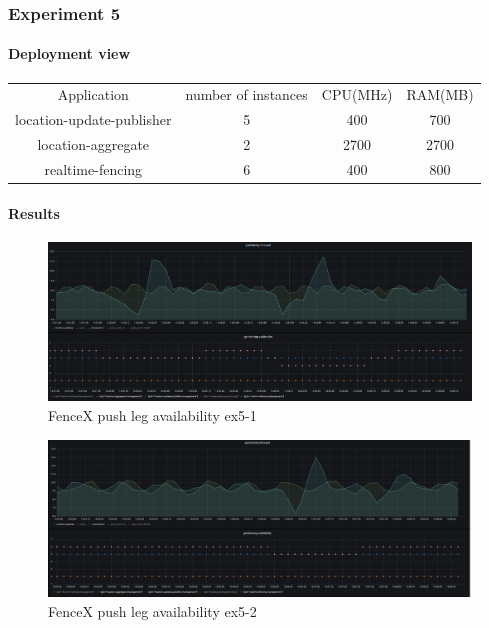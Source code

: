\documentclass[a4]{report}
\begin{document}
        \subsubsection{Experiment 5}

        \paragraph{Deployment view}
        \begin{center}
            \begin{tabular}{ c c c c }
                Application               & number of instances & CPU(MHz) & RAM(MB) \\
                location-update-publisher & 5                   & 400      & 700     \\
                location-aggregate        & 2                   & 2700     & 2700    \\
                realtime-fencing          & 6                   & 400      & 800     \\
            \end{tabular}
        \end{center}

        \paragraph{Results}
        \begin{figure}[ht]
            \caption{FenceX push leg availability ex5-1}
            \label{fig:ex5-1}
            \includegraphics[scale=0.4]{images/evaluation/ex5-benchmarking-ongoing-2per7sec.png}
        \end{figure}

        \begin{figure}[ht]
            \caption{FenceX push leg availability ex5-2}
            \label{fig:ex5-2}
            \includegraphics[scale=0.4]{images/evaluation/ex5-benchmarking-ongoing-2per6sec.png}
        \end{figure}
\end{document}
